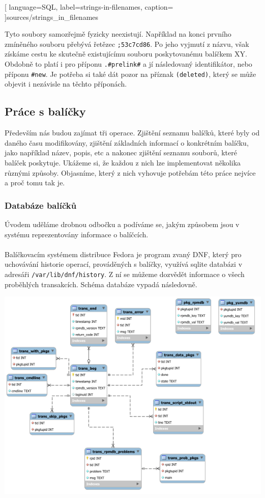 \documentclass[10pt,a4paper]{article}
\begin{document}
			
			[
				language=SQL,
				label=strings-in-filenames,
				caption={}
			]{sources/strings_in_filenames}

			Tyto soubory samozřejmě fyzicky neexistují. Například na konci prvního zmíněného souboru přebývá řetězec \texttt{;53c7cd86}. Po jeho vyjmutí z názvu, však získáme cestu ke skutečně existujícímu souboru poskytovanému balíčkem XY\@. Obdobně to platí i pro příponu \texttt{.\#prelink\#} a jí následovaný identifikátor, nebo příponu \texttt{\#new}. Je potřeba si také dát pozor na příznak \texttt{(deleted)}, který se může objevit i nezávisle na těchto příponách.

		\subsection{Práce s balíčky}
			Především nás budou zajímat tři operace. Zjištění seznamu balíčků, které byly od daného času modifikovány, zjištění základních informací o konkrétním balíčku, jako například název, popis, etc a nakonec zjištění seznamu souborů, které balíček poskytuje. Ukážeme si, že každou z nich lze implementovat několika různými způsoby. Objasníme, který z nich vyhovuje potřebám této práce nejvíce a proč tomu tak je.

			\subsubsection{Databáze balíčků}
			Úvodem uděláme drobnou odbočku a podíváme se, jakým způsobem jsou v systému reprezentovány informace o balíčcích.
			\\
			\\
			Balíčkovacím systémem distribuce Fedora je program zvaný DNF\@, který pro uchovávání historie operací, prováděných s balíčky, využívá sqlite databázi v adresáři \texttt{/var/lib/dnf/history}. Z ní se můžeme dozvědět informace o všech proběhlých transakcích. Schéma databáze vypadá následovně.

			\centerline{\includegraphics[scale=0.67]{images/dnf-database.png}}
\end{document}

